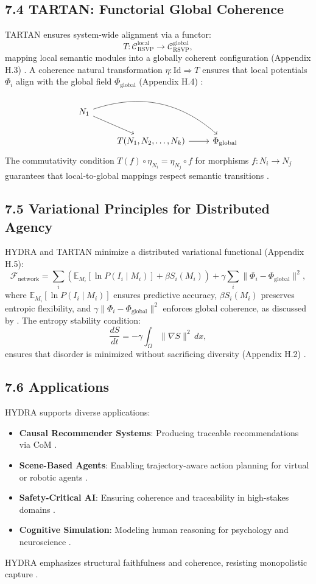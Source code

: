 \documentclass[12pt]{article}
\begin{document}
\subsection*{7.4 TARTAN: Functorial Global Coherence}
TARTAN ensures system-wide alignment via a functor:
\[
T: \mathcal{C}_{\text{RSVP}}^{\text{local}} \to \mathcal{C}_{\text{RSVP}}^{\text{global}},
\]
mapping local semantic modules into a globally coherent configuration (Appendix H.3) \citep{maclane1998}. A coherence natural transformation \(\eta: \text{Id} \Rightarrow T\) ensures that local potentials \(\Phi_i\) align with the global field \(\Phi_{\text{global}}\) (Appendix H.4) \citep{lawvere2009}:
\[
\begin{tikzcd}
N_1 \arrow[dr] \arrow[drr, bend left] & & \\
& T(N_1, N_2, \dots, N_k) \arrow[r] & \Phi_{\text{global}}
\end{tikzcd}
\]
The commutativity condition \(T(f) \circ \eta_{N_i} = \eta_{N_j} \circ f\) for morphisms \(f: N_i \to N_j\) guarantees that local-to-global mappings respect semantic transitions \citep{may1999}.
\subsection*{7.5 Variational Principles for Distributed Agency}
HYDRA and TARTAN minimize a distributed variational functional (Appendix H.5):
\[
\mathcal{F}_{\text{network}} = \sum_i \left( \mathbb{E}_{M_i}[\ln P(I_i \mid M_i)] + \beta S_i(M_i) \right) + \gamma \sum_i \|\Phi_i - \Phi_{\text{global}}\|^2,
\]
where \(\mathbb{E}_{M_i}[\ln P(I_i \mid M_i)]\) ensures predictive accuracy, \(\beta S_i(M_i)\) preserves entropic flexibility, and \(\gamma \|\Phi_i - \Phi_{\text{global}}\|^2\) enforces global coherence, as discussed by \citet{friston2010}. The entropy stability condition:
\[
\frac{dS}{dt} = -\gamma \int_{\Omega} \|\nabla S\|^2 \, dx,
\]
ensures that disorder is minimized without sacrificing diversity (Appendix H.2) \citep{shannon1948}.
\subsection*{7.6 Applications}
HYDRA supports diverse applications:
\begin{itemize}
    \item \textbf{Causal Recommender Systems}: Producing traceable recommendations via CoM \citep{pearl2009}.
    \item \textbf{Scene-Based Agents}: Enabling trajectory-aware action planning for virtual or robotic agents \citep{hohwy2013}.
    \item \textbf{Safety-Critical AI}: Ensuring coherence and traceability in high-stakes domains \citep{friston2010}.
    \item \textbf{Cognitive Simulation}: Modeling human reasoning for psychology and neuroscience \citep{tononi2004}.
\end{itemize}
HYDRA emphasizes structural faithfulness and coherence, resisting monopolistic capture \citep{zuboff2019}.
\end{document}

